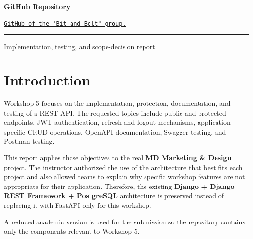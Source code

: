 \documentclass[11pt,a4paper]{article}
\begin{document}
\begin{titlepage}
\begin{minipage}{0.62\textwidth}
\end{minipage}

\vspace{1.25cm}

{\small
\color{textgray}
\textbf{GitHub Repository}
\par}

\vspace{0.25cm}

\href{https://github.com/Steven735-star/APLICACIONES-WEB/tree/main/Workshop5_MD_Marketing_Design}
{
    \color{accent}
    \texttt{GitHub of the "Bit and Bolt" group.}
}

\vfill

{\color{accent}
\rule{0.82\textwidth}{0.8pt}
\par}

\vspace{0.35cm}

{\small
\color{textgray}
Implementation, testing, and scope-decision report
\par}

\vspace{0.45cm}

\end{titlepage}

\tableofcontents
\newpage

\section{Introduction}

Workshop 5 focuses on the implementation, protection, documentation, and testing of a REST API. The requested topics include public and protected endpoints, JWT authentication, refresh and logout mechanisms, application-specific CRUD operations, OpenAPI documentation, Swagger testing, and Postman testing.

This report applies those objectives to the real \textbf{MD Marketing \& Design} project. The instructor authorized the use of the architecture that best fits each project and also allowed teams to explain why specific workshop features are not appropriate for their application. Therefore, the existing \textbf{Django + Django REST Framework + PostgreSQL} architecture is preserved instead of replacing it with FastAPI only for this workshop.

A reduced academic version is used for the submission so the repository contains only the components relevant to Workshop 5.
\end{document}

